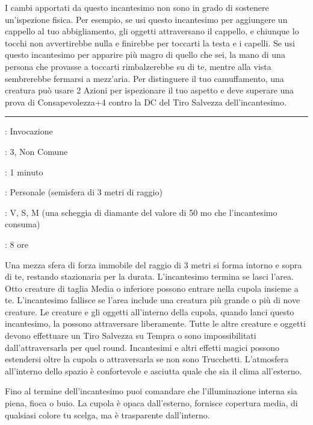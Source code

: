 \begin{multicols}{2}
I cambi apportati da questo incantesimo non sono in grado di sostenere un'ispezione fisica. Per esempio, se usi questo incantesimo per aggiungere un cappello al tuo abbigliamento, gli oggetti attraversano il cappello, e chiunque lo tocchi non avvertirebbe nulla e finirebbe per toccarti la testa e i capelli. Se usi questo incantesimo per apparire più magro di quello che sei, la mano di una persona che provasse a toccarti rimbalzerebbe su di te, mentre alla vista sembrerebbe fermarsi a mezz'aria. Per distinguere il tuo camuffamento, una creatura può usare 2 Azioni per ispezionare il tuo aspetto e deve superare una prova di Consapevolezza+4 contro la DC del Tiro Salvezza dell'incantesimo.

\smallskip\noindent\rule{\linewidth}{2pt} \hypertarget{Capanna}{}\medskip{}
\noindent
\begin{description}[noitemsep, topsep=0pt, parsep=0pt, partopsep=0pt, leftmargin=0cm, labelwidth=2.8cm]
	\item[\textbf{Lista di Magia}]: Invocazione
	\item[\textbf{Livello}]: 3, Non Comune
	\item[\textbf{T. di Lancio}]: 1 minuto
	\item[\textbf{Gittata}]: Personale (semisfera di 3 metri di raggio)
	\item[\textbf{Componenti}]: V, S, M (una scheggia di diamante del valore di 50 mo che l'incantesimo consuma)
	\item[\textbf{Durata}]: 8 ore
\end{description}

Una mezza sfera di forza immobile del raggio di 3 metri si forma intorno e sopra di te, restando stazionaria per la durata. L'incantesimo termina se lasci l'area. Otto creature di taglia Media o inferiore possono entrare nella cupola insieme a te. L'incantesimo fallisce se l'area include una creatura più grande o più di nove creature. Le creature e gli oggetti all'interno della cupola, quando lanci questo incantesimo, la possono attraversare liberamente. Tutte le altre creature e oggetti devono effettuare un Tiro Salvezza su Tempra o sono impossibilitati dall'attraversarla per quel round. Incantesimi e altri effetti magici possono estendersi oltre la cupola o attraversarla se non sono Trucchetti. L'atmosfera all'interno dello spazio è confortevole e asciutta quale che sia il clima all'esterno.

Fino al termine dell'incantesimo puoi comandare che l'illuminazione interna sia piena, fioca o buio. La cupola è opaca dall'esterno, fornisce copertura media, di qualsiasi colore tu scelga, ma è trasparente dall'interno.


\end{multicols}
